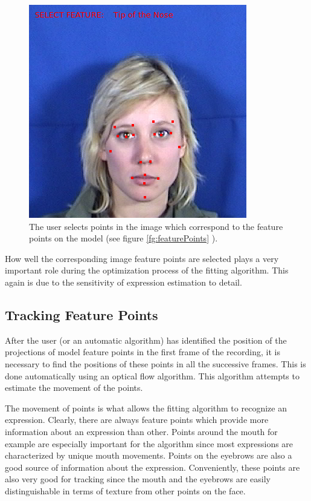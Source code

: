 \documentclass[11pt,a4paper]{report}
\begin{document}
\begin{figure}[H]
\begin{centering}
\includegraphics[scale=0.60]{images/featureSelection.png}
\par\end{centering}

\caption{The user selects points in the image which correspond to the feature
  points on the model (see figure \ref{fg:featurePoints} ).}
\label{fg:featurePoints2}

\end{figure}

How well the corresponding image feature points are selected plays a very important role
during the optimization process of the fitting algorithm. This again is due to the
sensitivity of expression estimation to detail.

\subsection{Tracking Feature Points}
After the user (or an automatic algorithm) has identified the position of the projections of model
feature points in the first frame of the recording, it is necessary to find
the positions of these points in all the successive frames. This is done
automatically using an optical flow algorithm. This algorithm attempts to
estimate the movement of the points.

The movement of points is what allows the fitting algorithm to recognize an
expression. Clearly, there are always feature points which provide more information about an
expression than
other. Points around the mouth for example are especially important for the
algorithm since most expressions are characterized by unique mouth
movements. Points on the eyebrows are also a good source of information about
the expression. Conveniently, these points are also very good for tracking since
the mouth and the eyebrows are easily distinguishable in terms of texture from
other points on the face. 
\end{document}
